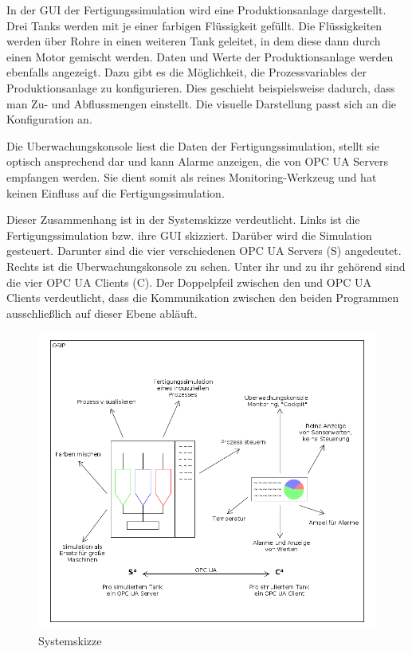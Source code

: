 \documentclass[parskip=full]{scrartcl}
\begin{document}
In der GUI der \gls{Fertigungssimulation} wird eine \gls{Produktionsanlage} dargestellt.
Drei Tanks werden mit je einer farbigen Flüssigkeit gefüllt. Die Flüssigkeiten werden über Rohre in einen weiteren Tank geleitet,
in dem diese dann durch einen Motor gemischt werden. Daten und Werte der \gls{Produktionsanlage} werden ebenfalls angezeigt.
Dazu gibt es die Möglichkeit, die \glspl{Prozessvariable} der \gls{Produktionsanlage} zu konfigurieren. Dies geschieht beispielsweise dadurch, dass man
Zu- und Abflussmengen einstellt. Die visuelle Darstellung passt sich an die Konfiguration an.

Die \gls{Uberwachungskonsole} liest die Daten der \gls{Fertigungssimulation}, stellt sie optisch ansprechend dar und kann Alarme
anzeigen, die von \glspl{OPC UA Server} empfangen werden. Sie dient somit als reines Monitoring-Werkzeug
und hat keinen Einfluss auf die \gls{Fertigungssimulation}.

Dieser Zusammenhang ist in der Systemskizze verdeutlicht. Links ist die \gls{Fertigungssimulation} bzw. ihre \gls{GUI} skizziert.
Dar\"uber wird die Simulation gesteuert. Darunter sind die vier verschiedenen \glspl{OPC UA Server} (S) angedeutet.
Rechts ist die \gls{Uberwachungskonsole} zu sehen. Unter ihr und zu ihr geh\"orend sind die vier \glspl{OPC UA Client} (C).
Der Doppelpfeil zwischen den  und \glspl{OPC UA Client} verdeutlicht, dass die Kommunikation
zwischen den beiden Programmen ausschließlich auf dieser Ebene abl\"auft.

\begin{figure}[H]
  \centering
  \includegraphics[scale=0.5]{../system-sketch.png}
  \caption{Systemskizze}
\end{figure}
\end{document}

